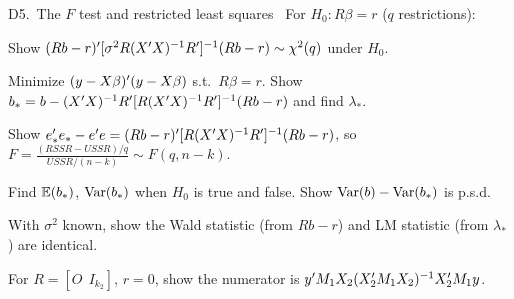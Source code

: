 \documentclass[11pt]{article}
\newcommand{\tagbox}[2]{\tcbox[on line, colback=#1, colframe=#1, coltext=white,
  boxsep=1pt, left=3pt, right=3pt, top=0pt, bottom=0pt, arc=1.5pt]{\scriptsize\sffamily\bfseries #2}}
\newcommand{\must}{\tagbox{examred}{$\star\star\star$ MUST}}
\newcommand{\newtag}{\tagbox{qnavy!60}{NEW}}
\begin{document}
\begin{qbox}{D5.\ The $F$ test and restricted least squares}{\must\ \newtag}
For $H_{0}:R\beta=r$ ($q$ restrictions):
\begin{flatlist}
  \item[(a)] Show $(Rb-r)^{\prime}[\sigma^{2}R(X^{\prime} X)^{-1}R^{\prime}]^{-1}(Rb-r)\sim\chi^{2}(q)$ under $H_{0}$.
  \item[(b)] Minimize $(y-X\beta)^{\prime}(y-X\beta)$ s.t.\ $R\beta=r$. Show $b_{*}=b-(X^{\prime} X)^{-1}R^{\prime}[R(X^{\prime} X)^{-1}R^{\prime}]^{-1}(Rb-r)$ and find $\lambda_{*}$.
  \item[(c)] Show $e_{*}^{\prime} e_{*}-e^{\prime} e=(Rb-r)^{\prime}[R(X^{\prime} X)^{-1}R^{\prime}]^{-1}(Rb-r)$, so $F=\frac{(RSSR-USSR)/q}{USSR/(n-k)}\sim F(q,n-k)$.
  \item[(d)] Find $\mathbb{E}(b_{*})$, $\operatorname{Var}(b_{*})$ when $H_{0}$ is true and false. Show $\operatorname{Var}(b)-\operatorname{Var}(b_{*})$ is p.s.d.
  \item[(e)] With $\sigma^{2}$ known, show the Wald statistic (from $Rb-r$) and LM statistic (from $\lambda_{*}$) are identical.
  \item[(f)] For $R=[O\ \ I_{k_{2}}]$, $r=0$, show the numerator is $y^{\prime} M_{1}X_{2}(X_{2}^{\prime} M_{1}X_{2})^{-1}X_{2}^{\prime} M_{1}y$.
\end{flatlist}
\end{qbox}
\end{document}

